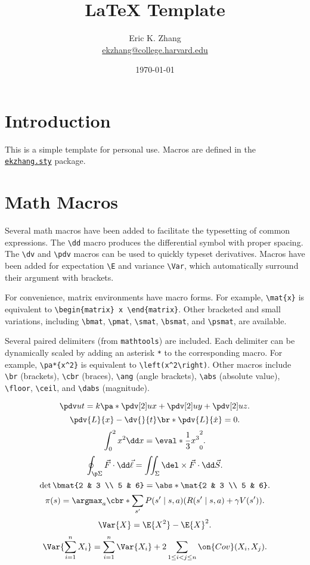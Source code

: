 \documentclass[11pt]{article}
\title{\LaTeX{} Template}
\author{Eric K. Zhang\\
\href{mailto:ekzhang@college.harvard.edu}{ekzhang@college.harvard.edu}}
\date{\today}
\begin{document}
\maketitle

\section{Introduction}
\label{sec:intro}
This is a simple template for personal use. Macros are defined in the \href{run:./ekz.sty}{\texttt{ekzhang.sty}} package.

\section{Math Macros}
Several math macros have been added to facilitate the typesetting of common expressions. The \verb|\dd| macro produces the differential symbol with proper spacing. The \verb|\dv| and \verb|\pdv| macros can be used to quickly typeset derivatives. Macros have been added for expectation \verb|\E| and variance \verb|\Var|, which automatically surround their argument with brackets.

For convenience, matrix environments have macro forms. For example, \verb|\mat{x}| is equivalent to \verb|\begin{matrix} x \end{matrix}|. Other bracketed and small variations, including \verb|\bmat|, \verb|\pmat|, \verb|\smat|, \verb|\bsmat|, and \verb|\psmat|, are available.

Several paired delimiters (from \verb|mathtools|) are included. Each delimiter can be dynamically scaled by adding an asterisk \verb|*| to the corresponding macro. For example, \verb|\pa*{x^2}| is equivalent to \verb|\left(x^2\right)|. Other macros include \verb|\br| (brackets), \verb|\cbr| (braces), \verb|\ang| (angle brackets), \verb|\abs| (absolute value), \verb|\floor|, \verb|\ceil|, and \verb|\dabs| (magnitude).

\[ \pdv ut = k\pa*{\pdv[2] ux + \pdv[2] uy + \pdv[2] uz}. \]
\[ \pdv{L}{x} - \dv{}{t}\br*{\pdv{L}{\dot x}} = 0. \]
\[ \int_0^2 x^2 \dd x = \eval*{\frac 13 x^3}_0^2. \]
\[ \oint_{\p\Sigma} \vec F \cdot \dd \vec\ell = \iint_{\Sigma} \del \times \vec F \cdot \dd \vec S. \]
\[ \det \bmat{2 & 3 \\ 5 & 6} = \abs*{\mat{2 & 3 \\ 5 & 6}}. \]
\[ \pi(s) = \argmax_a \cbr*{\sum_{s'} P(s' \mid s, a) (R(s' \mid s, a) + \gamma V(s'))}. \]
\[ \Var{X} = \E{X^2} - \E{X}^2. \]
\[ \Var{\sum_{i=1}^n X_i} = \sum_{i=1}^n \Var{X_i} + 2\sum_{1 \leq i < j \leq n} \on{Cov}(X_i, X_j). \]
\end{document}
